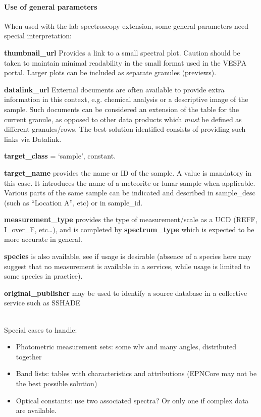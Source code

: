 \documentclass[11pt,a4paper]{ivoa}
\begin{document}
\paragraph{Use of general parameters}

When used with the lab spectroscopy extension, some general parameters
need special interpretation:

\textbf{thumbnail\_url} Provides a link to a small spectral plot.
Caution should be taken to maintain minimal readability in the small format
used in the VESPA portal. Larger plots can be included as separate granules
(previews).

\textbf{datalink\_url} External documents are often available to provide
extra information in this context, e.g. chemical analysis or a descriptive
image of the sample. Such documents can be considered an extension of the
table for the current granule, as opposed to other data products which
\emph{must} be defined as different granules/rows. The best solution
identified consists of providing such links via Datalink.

\textbf{target\_class} = `sample', constant.

\textbf{target\_name} provides the name or ID of the sample.  A value
is mandatory in this case. It introduces the name of a meteorite or
lunar sample when applicable. Various parts of the same sample can be
indicated and described in sample\_desc (such as ``Location A'', etc)
or in sample\_id.

\textbf{measurement\_type} provides the type of measurement/scale as a UCD
(REFF, I\_over\_F, etc…), and is completed by \textbf{spectrum\_type}
which is expected to be more accurate in general.

\textbf{species} is also available, see if usage is desirable (absence of
a species here may suggest that no measurement is available in a services,
while usage is limited to some species in practice).

\textbf{original\_publisher }may be used to identify a source database
in a collective service such as SSHADE


\textbf{\\}
Special cases to handle:

\begin{itemize}
\item Photometric measurement sets: some wlv and many angles,
distributed together
\item Band lists: tables with characteristics and attributions
(EPNCore may not be the best possible solution)
\item Optical constants: use two associated spectra?
Or only one if complex data are available.
\end{itemize}
\end{document}
